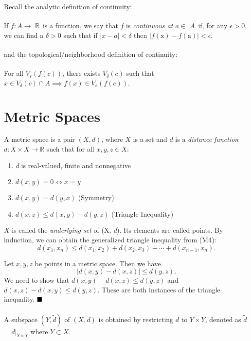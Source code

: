 \documentclass[11pt]{article}
\newcommand{\defn}[0]{\tcbhighmath[boxrule=0.5mm, colframe=cyan!20, colback=cyan!20, arc=10mm, size=fbox]{\mathrm{DEF:}}}
\newcommand{\lemma}[0]{\tcbhighmath[boxrule=0.5mm, colframe=Melon, colback=Melon, arc=10mm, size=fbox]{\mathrm{Lemma:}}}
\newcommand{\lemmapf}[0]{\tcbhighmath[boxrule=0.5mm, colframe=Melon, colback=white, arc=10mm, size=fbox]{\mathrm{Proof:}}}
\newcommand{\R}[0]{$\mathbb{R} $}
\begin{document}
\noindent{}Recall the analytic definition of continuity: \\\\
\noindent{}\defn{} If $f: A \to$ \R\, is a function, we say that $f$ is \emph{continuous at $a \in$ A}\, if, for any $\epsilon > 0$, we can find a $\delta > 0$ such that if $|x - a| < \delta$ then $|f(\mathrm{x}) - f(\mathrm{a})| < \epsilon$.\\\\  
and the topological/neighborhood definition of continuity:\\\\
\noindent{}\defn{} For all $V_{\varepsilon}(f(c))$, there exists $V_{\delta}(c)$ such that $x \in V_{\delta}(c) \cap A \implies f(x) \in V_{\varepsilon}(f(c))$.
\section{Metric Spaces}

\noindent{} \defn{}
A metric space is a pair $(X,d)$, where $X$ is a set and $d$ is a \textit{distance function} $ d: X \times X \to \mathbb{R} $ such that for all $x, y, z \in X$:
\begin{enumerate}[label= (M\arabic*), left=1cm]
    \item \textit{d} is real-valued, finite and nonnegative
    \item $\mathit{d}(x, y) = 0 \iff x = y$
    \item $\mathit{d}(x, y) = \mathit{d}(y, x)$ \hfill (Symmetry)
    \item $\textit{d}(x, z) \leq \textit{d}(x, y) + \textit{d}(y, z)$ \hfill (Triangle Inequality)
\end{enumerate}
$X$ is called the \textit{underlying set} of (X, \textit{d}). Its elements are called points. 
By induction, we can obtain the generalized triangle inequality from (M4):
\begin{equation}
  \textit{d} (x_1, x_n) \leq \textit{d}(x_1, x_2) + \textit{d}(x_2, x_3) + \cdots + \textit{d}(x_{n-1}, x_n).
\end{equation}

\noindent{}\lemma{} Let $x, y, z$ be points in a metric space. Then we have
\begin{equation}
  |d(x, y) - d(x, z)| \leq d(y,z).
\end{equation}
\lemmapf{} We need to show that $d(x, y) - d(x, z) \leq d(y,z)$ and $d(x, z) - d(x, y) \leq d(y,z)$. These are both instances of the triangle inequality. $\hfill \blacksquare$\\\\
\noindent\defn{}
A subspace $(Y, \tilde{d})$ of $(X, d)$ is obtained by restricting $d$ to $Y \times Y$, denoted as $\tilde{d}$ = $d|_{Y\times Y}$ where $Y\subset X$.
\end{document}
